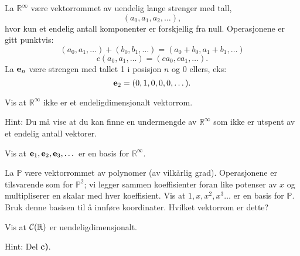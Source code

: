 \begin{oppgave}

La $\mathbb{R}^\infty$ være vektorrommet av uendelig lange strenger med tall, $$(a_0,a_1,a_2,\dots),$$ hvor kun et endelig antall komponenter er forskjellig fra null. Operasjonene er gitt punktvis:
$$(a_0,a_1,\dots)+(b_0,b_1,\dots)=(a_0+b_0,a_1+b_1,\dots)$$
$$c(a_0,a_1,\dots)={(ca_0,ca_1,\dots)}.$$ La $\mathbf{e}_n$ være strengen med tallet 1 i posisjon $n$ og 0 ellers, eks: $$\mathbf{e}_2=(0,1,0,0,0,\dots).$$

\begin{punkt}
Vis at $\mathbb{R}^\infty$ ikke er et endeligdimensjonalt vektorrom.

\noindent
Hint: Du må vise at du kan finne en undermengde av $\mathbb{R}^\infty$ som ikke er utspent av et endelig antall vektorer.
\end{punkt}

\begin{punkt}
Vis at $\mathbf{e}_1,\mathbf{e}_2,\mathbf{e}_3,\dots$ er en basis for $\mathbb{R}^\infty$.
\end{punkt}

\begin{punkt}
La $\mathbb{P}$ være vektorrommet av polynomer (av vilkårlig grad). Operasjonene er tilsvarende som for $\mathbb{P}^2$; vi legger sammen koeffisienter foran like potenser av $x$ og multipliserer en skalar med hver koeffisient. Vis at $1,x,x^2,x^3\dots$ er en basis for $\mathbb{P}$. Bruk denne basisen til å innføre koordinater. Hvilket vektorrom er dette?
\end{punkt}


\begin{punkt}
Vis at $\mathcal{C}(\mathbb{R})$ er uendeligdimensjonalt.

\noindent
Hint: Del \textbf{c)}.
\end{punkt}

\end{oppgave}

